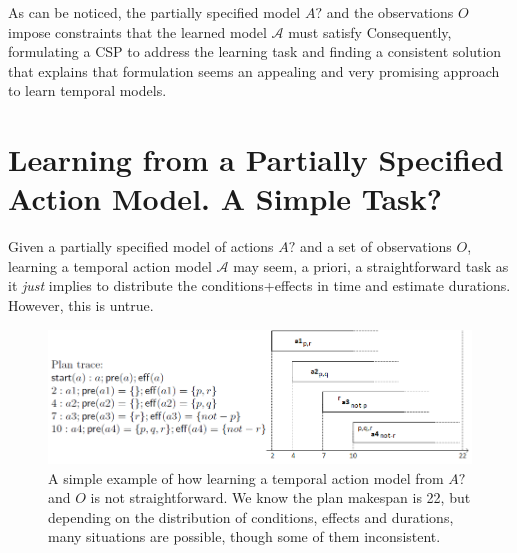 \documentclass[runningheads]{llncs}
\newcommand{\tup}[1]{{\langle #1 \rangle}}
\newcommand{\pre}{\mathsf{pre}}    %
\newcommand{\eff}{\mathsf{eff}}    %
\newcommand{\obs}{\mathsf{obs}}    %
\newcommand{\start}{\mathsf{start}}%
\begin{document}
As can be noticed, the partially specified model $A?$ and the observations $O$ impose constraints that the learned model $\mathcal{A}$ must satisfy
Consequently, formulating a CSP to address the learning task and finding a consistent solution that explains that formulation seems an appealing and very promising approach to learn temporal models.





\section{Learning from a Partially Specified Action Model. A Simple Task?}
\label{sec:simpleTask}

Given a partially specified model of actions $A?$ and a set of observations $O$, learning a temporal action model $\mathcal{A}$  may seem, a priori, a straightforward task as it \emph{just} implies to distribute the conditions+effects in time and estimate durations. However, this is untrue.


\begin{figure}
\center \includegraphics[width=12cm]{ejemploacciones2.png}
\caption{A simple example of how learning a temporal action model from $A?$ and $O$ is not straightforward. We know the plan makespan is 22, but depending on the distribution of conditions, effects and durations, many situations are possible, though some of them inconsistent.}
\label{fig:exampleplantrace}
\end{figure}
\end{document}
